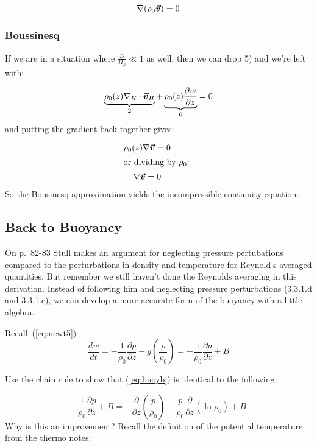 \documentclass[12pt]{article}
\begin{document}
\begin{equation}
  \label{eq:anel2}
  \nabla ( \rho_0 \boldsymbol{\vec{v}} ) = 0
\end{equation}

\subsubsection{Boussinesq}
\label{sec:boussinesq}

If we are in a situation where $\frac{D }{H_\rho} \ll 1$ as well,
then we can drop 5) and we're left with:

\begin{equation}
  \label{eq:bous1}
  \underbrace{\rho_0(z) \nabla_H \cdot \boldsymbol{\vec{v}}_H}_2 + 
\underbrace{\rho_0(z) \frac{\partial w }{\partial z}}_6 =0
\end{equation}
and putting the gradient back together gives:

\begin{gather}
  \label{eq:bous2}
\rho_0(z) \nabla \boldsymbol{\vec{v}} =0\\
\intertext{or dividing by $\rho_0$: }
\nabla \boldsymbol{\vec{v}} =0
\end{gather}
So the Bousinesq approximation yields the incompressible continuity equation.


\subsection{Back to Buoyancy}
\label{sec:back-buoyancy}

On p.~82-83 Stull makes an argument for neglecting pressure pertubations compared 
to the perturbations in density and temperature for Reynold's averaged
quantities.  But remember we still haven't done the Reynolds averaging 
in this derivation.  Instead of following him and neglecting pressure perturbations
(3.3.1.d and 3.3.1.e),  we can develop a more accurate form of the 
buoyancy with a little algebra.

Recall~(\ref{eq:newt5})
\begin{equation}
  \label{eq:buoyb}
   \frac{ dw}{dt}  = - \frac{1 }{\rho_0} \frac{ \partial p }{\partial z} 
- g \left ( \frac{ \rho}{\rho_0} \right ) =
- \frac{1 }{\rho_0} \frac{ \partial p }{\partial z} 
+ B
\end{equation}

Use the chain rule to show that (\ref{eq:buoyb}) is identical to the
following:

\begin{equation}
  \label{eq:buoyc}
   - \frac{1 }{\rho_0} \frac{ \partial p }{\partial z} 
+ B =
- \frac{\partial  }{\partial z} \left ( \frac{  p }{\rho_0} \right )
- \frac{p }{\rho_0} \frac{\partial  }{\partial z} (\ln \rho_0)
+ B
\end{equation}
Why is this an improvement?  Recall the definition of the potential
temperature from 
\href{https://www.dropbox.com/scl/fi/zuk9evzf47qdsxi9tvgx7/thermo.pdf?rlkey=hbz3bpt6gxv5ly8rg1njfj9e4&dl=0}{the thermo notes}:
\end{document}
